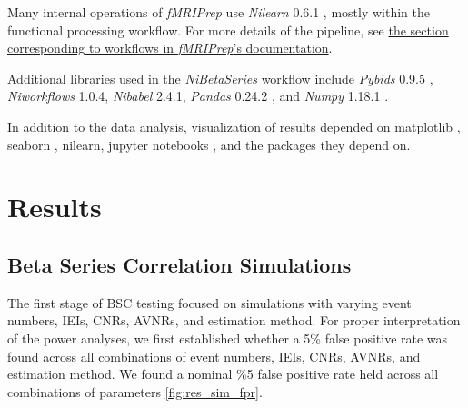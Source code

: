 \documentclass[10pt,letterpaper]{article}
\begin{document}
Many internal operations of \emph{fMRIPrep} use \emph{Nilearn} 0.6.1
\cite[RRID:SCR\_001362]{nilearn}, mostly within the functional
processing workflow. For more details of the pipeline, see
\href{https://fmriprep.readthedocs.io/en/latest/workflows.html}{the
section corresponding to workflows in \emph{fMRIPrep}'s documentation}.

Additional libraries used in the \emph{NiBetaSeries} workflow include
\emph{Pybids} 0.9.5 \cite{Yarkoni2019}, \emph{Niworkflows} 1.0.4,
\emph{Nibabel} 2.4.1, \emph{Pandas} 0.24.2 \cite{McKinney2010}, and
\emph{Numpy} 1.18.1 \cite{VanDerWalt2011, Oliphant2006}.

In addition to the data analysis, visualization of results depended
on matplotlib \cite{Hunter2007}, seaborn \cite{Waskom2020}, nilearn,
jupyter notebooks \cite{Kluyver2016a}, and the packages they depend on.



\section*{Results}
\label{results}

\subsection*{Beta Series Correlation Simulations}
\label{results:bsc-simulations}

The first stage of BSC testing focused on simulations with varying event numbers,
IEIs, CNRs, AVNRs, and estimation method.
For proper interpretation of the power analyses, we first established whether
a 5\% false positive rate was found across all combinations of
event numbers, IEIs, CNRs, AVNRs, and estimation method.
We found a nominal \%5 false positive rate held across all combinations
of parameters \ref{fig:res_sim_fpr}.
\end{document}
